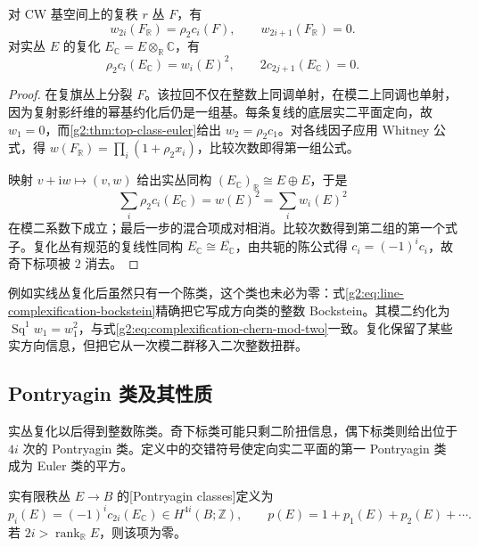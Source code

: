 \begin{proposition}\label{g2:prop:real-complex-characteristic}
	对 CW 基空间上的复秩 \(r\) 丛 \(F\)，有
	\begin{equation}\label{g2:eq:complex-real-sw}
		w_{2i}(F_{\mathbb R})=\rho_2c_i(F),\qquad w_{2i+1}(F_{\mathbb R})=0.
	\end{equation}
	对实丛 \(E\) 的复化 \(E_{\mathbb C}=E\otimes_{\mathbb R}\mathbb C\)，有
	\begin{equation}\label{g2:eq:complexification-chern-mod-two}
		\rho_2c_i(E_{\mathbb C})=w_i(E)^2,\qquad 2c_{2j+1}(E_{\mathbb C})=0.
	\end{equation}
\end{proposition}
\begin{proof}
	在复旗丛上分裂 \(F\)。该拉回不仅在整数上同调单射，在模二上同调也单射，因为复射影纤维的幂基约化后仍是一组基。每条复线的底层实二平面定向，故 \(w_1=0\)，而\cref{g2:thm:top-class-euler}给出 \(w_2=\rho_2c_1\)。对各线因子应用 Whitney 公式，得 \(w(F_{\mathbb R})=\prod_i(1+\rho_2x_i)\)，比较次数即得第一组公式。

	映射 \(v+\mathrm i w\mapsto(v,w)\) 给出实丛同构 \((E_{\mathbb C})_{\mathbb R}\cong E\oplus E\)，于是
	\[
		\sum_i\rho_2c_i(E_{\mathbb C})=w(E)^2=\sum_iw_i(E)^2
	\]
	在模二系数下成立；最后一步的混合项成对相消。比较次数得到第二组的第一个式子。复化丛有规范的复线性同构 \(E_{\mathbb C}\cong\overline{E_{\mathbb C}}\)，由共轭的陈公式得 \(c_i=(-1)^ic_i\)，故奇下标项被 \(2\) 消去。
\end{proof}

例如实线丛复化后虽然只有一个陈类，这个类也未必为零：式\eqref{g2:eq:line-complexification-bockstein}精确把它写成方向类的整数 Bockstein。其模二约化为 \(\operatorname{Sq}^1w_1=w_1^2\)，与式\eqref{g2:eq:complexification-chern-mod-two}一致。复化保留了某些实方向信息，但把它从一次模二群移入二次整数扭群。

\subsection{Pontryagin 类及其性质}
\label{g2:subsec:2103:05}
实丛复化以后得到整数陈类。奇下标类可能只剩二阶扭信息，偶下标类则给出位于 \(4i\) 次的 Pontryagin 类。定义中的交错符号使定向实二平面的第一 Pontryagin 类成为 Euler 类的平方。

\begin{definition}\label{g2:def:pontryagin-classes}
	实有限秩丛 \(E\to B\) 的[Pontryagin classes]定义为
	\begin{equation}\label{g2:eq:pontryagin-definition}
		p_i(E)=(-1)^i c_{2i}(E_{\mathbb C})\in H^{4i}(B;\mathbb Z),\qquad p(E)=1+p_1(E)+p_2(E)+\cdots.
	\end{equation}
	若 \(2i>\operatorname{rank}_{\mathbb R}E\)，则该项为零。
\end{definition}

